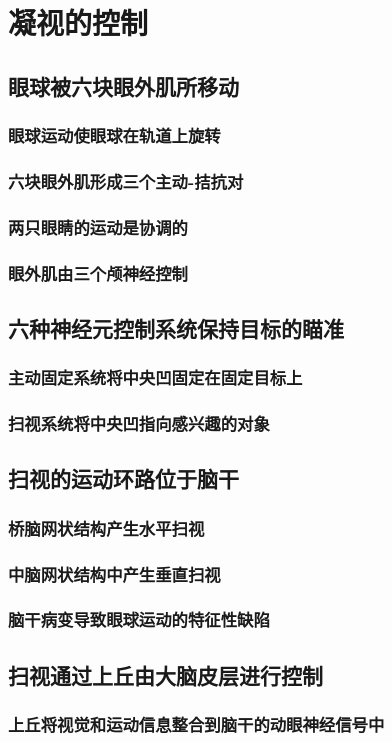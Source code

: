 \chapter{凝视的控制}

\section{眼球被六块眼外肌所移动}
\subsection{眼球运动使眼球在轨道上旋转}
\subsection{六块眼外肌形成三个主动-拮抗对}
\subsection{两只眼睛的运动是协调的}
\subsection{眼外肌由三个颅神经控制}

\section{六种神经元控制系统保持目标的瞄准}
\subsection{主动固定系统将中央凹固定在固定目标上}
\subsection{扫视系统将中央凹指向感兴趣的对象}

\section{扫视的运动环路位于脑干}
\subsection{桥脑网状结构产生水平扫视}
\subsection{中脑网状结构中产生垂直扫视}
\subsection{脑干病变导致眼球运动的特征性缺陷}

\section{扫视通过上丘由大脑皮层进行控制}
\subsection{上丘将视觉和运动信息整合到脑干的动眼神经信号中}

